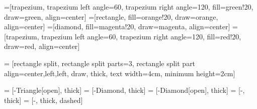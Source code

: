 

=[trapezium, trapezium left angle=60, trapezium right angle=120, fill=green!20, draw=green, align=center]
=[rectangle, fill=orange!20, draw=orange, align=center]
=[diamond, fill=magenta!20, draw=magenta, align=center]
=[trapezium, trapezium left angle=60, trapezium right angle=120, fill=red!20, draw=red, align=center]











 = [rectangle split, rectangle split parts=3, rectangle split part align={center,left,left}, draw, thick, text width=4cm, minimum height=2cm]


 = [-{Triangle[open]}, thick]	%
 = [-{Diamond}, thick]	%
 = [-{Diamond[open]}, thick]	%
 = [-, thick]	%
 = [-, thick, dashed]	%










